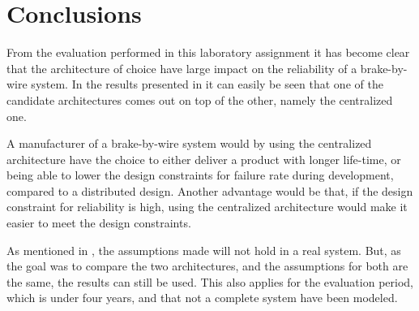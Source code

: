 \newpage
\section{Conclusions}
\label{S6}
From the evaluation performed in this laboratory assignment it has become clear that the architecture of choice have large impact on the reliability of a brake-by-wire system.  In the results presented in  it can easily be seen that one of the candidate architectures comes out on top of the other, namely the centralized one. 

A manufacturer of a brake-by-wire system would by using the centralized architecture have the choice to either deliver a product with longer life-time, or being able to lower the design constraints for failure rate during development, compared to a distributed design. Another advantage would be that, if the design constraint for reliability is high, using the centralized architecture would make it easier to meet the design constraints.

As mentioned in , the assumptions made will not hold in a real system. But, as the goal was to compare the two architectures, and the assumptions for both are the same, the results can still be used. This also applies for the evaluation period, which is under four years, and that not a complete system have been modeled.  


